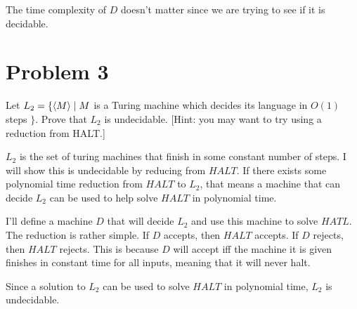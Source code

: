 \documentclass[12pt]{article}
\begin{document}
The time complexity of $D$ doesn't matter since we are trying to see if it is decidable.


\section*{Problem 3}

\begin{questionbox}
	Let $L_2 = \{ \braket{M} \mid M $ is a Turing machine which decides its language in $O(1)$ steps $\}$. Prove that
	$L_2$ is undecidable. [Hint: you may want to try using a reduction from HALT.]
\end{questionbox}


$L_2$ is the set of turing machines that finish in some constant number of steps. I will show this is undecidable by reducing from $HALT$. If there exists some polynomial time reduction from $HALT$ to $L_2$, that means a machine that can decide $L_2$ can be used to help solve $HALT$ in polynomial time.

I'll define a machine $D$ that will decide $L_2$ and use this machine to solve $HATL$. The reduction is rather simple. If $D$ accepts, then $HALT$ accepts. If $D$ rejects, then $HALT$ rejects. This is because $D$ will accept iff the machine it is given finishes in constant time for all inputs, meaning that it will never halt.

Since a solution to $L_2$ can be used to solve $HALT$ in polynomial time, $L_2$ is undecidable.
\end{document}
